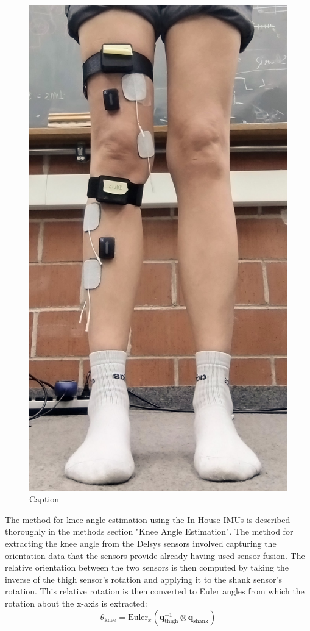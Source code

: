 \begin{figure} 
    \centering
    \includegraphics[width=\linewidth]{images/delsyssetup.jpg}
    \caption{Caption}
    \label{fig:enter-label}
\end{figure}

The method for knee angle estimation using the In-House IMUs is described thoroughly in the methods section "Knee Angle Estimation". The method for extracting the knee angle from the Delsys sensors involved capturing the orientation data that the sensors provide already having used sensor fusion. The relative orientation between the two sensors is then computed by taking the inverse of the thigh sensor's rotation and applying it to the shank sensor's rotation. This relative rotation is then converted to Euler angles from which the rotation about the x-axis is extracted:
\begin{equation}
    \theta_{\text{knee}} = \text{Euler}_x \left( \mathbf{q}_{\text{thigh}}^{-1} \otimes \mathbf{q}_{\text{shank}} \right)
\end{equation}

